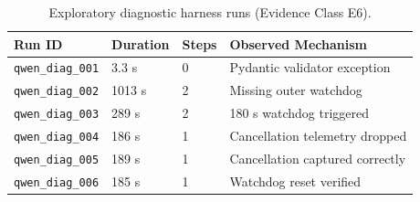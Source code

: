 \documentclass[conference]{IEEEtran}
\begin{document}
\begin{table}[ht]
\centering
\footnotesize
\caption{Exploratory diagnostic harness runs (Evidence Class E6).}
\label{tab:qwen_runs}
\begin{tabular}{llll}
\toprule
\textbf{Run ID} & \textbf{Duration} & \textbf{Steps} & \textbf{Observed Mechanism} \\
\midrule
\texttt{qwen\_diag\_001} & 3.3 s    & 0 & Pydantic validator exception \\
\texttt{qwen\_diag\_002} & 1013 s   & 2 & Missing outer watchdog \\
\texttt{qwen\_diag\_003} & 289 s    & 2 & 180 s watchdog triggered \\
\texttt{qwen\_diag\_004} & 186 s    & 1 & Cancellation telemetry dropped \\
\texttt{qwen\_diag\_005} & 189 s    & 1 & Cancellation captured correctly \\
\texttt{qwen\_diag\_006} & 185 s    & 1 & Watchdog reset verified \\
\bottomrule
\end{tabular}
\end{table}
\end{document}

